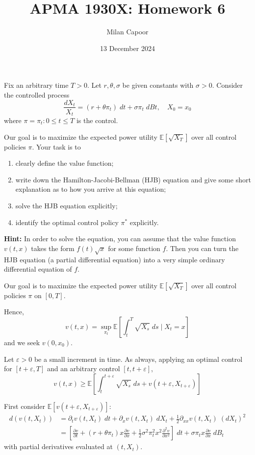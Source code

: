 \documentclass[12pt]{article}
\title{APMA 1930X: Homework 6}
\author{Milan Capoor}
\date{13 December 2024}
\newcommand{\E}{\mathbb{E}}
\newcommand{\ep}{\varepsilon}
\newcommand*{\tbf}[1]{\ifmmode\mathbf{#1}\else\textbf{#1}\fi}
\begin{document}
\maketitle

Fix an arbitrary time $T > 0$. Let $r, \theta, \sigma$ be given constants with $\sigma > 0$.
Consider the controlled process
\[\frac{dX_t}{X_t} = (r + \theta \pi_t)\; dt + \sigma \pi_t \; dBt,\quad X_0 = x_0\] 
where $\pi  = {\pi_t : 0 \leq t \leq T}$ is the control. 

Our goal is to maximize the expected power utility $\E[\sqrt{X_T}]$ over all control policies $\pi$. Your task is to
\begin{enumerate}
    \item clearly define the value function;
    \item write down the Hamilton-Jacobi-Bellman (HJB) equation and give some short explanation as to how you arrive at this equation;
    \item solve the HJB equation explicitly;
    \item identify the optimal control policy $\pi^*$ explicitly.
\end{enumerate}

\tbf{Hint:} In order to solve the equation, you can assume that the value function $v(t, x)$ takes the form $f(t)\sqrt{x}$ for some function $f$. Then you can turn the HJB equation (a partial differential equation) into a very simple ordinary differential equation of $f$.

    \color{blue}
        Our goal is to maximize the expected power utility $\E[\sqrt{X_T}]$ over all control policies $\pi$ on $[0, T]$.

        Hence, 
        \[v(t, x) = \sup_{\pi_t} \E\left[\int_t^{T} \sqrt{X_s}\; ds \; | \; X_t = x\right]\]
        and we seek $v(0, x_0)$. 

        Let $\ep > 0$ be a small increment in time. As always, applying an optimal control for $[t + \ep, T]$ and an arbitrary control $[t, t + \ep]$, 
        \[v(t, x) \geq \E\left[\int_t^{t + \ep} \sqrt{X_s}\; ds + v(t+ \ep, X_{t + \ep}) \right]\]

        First consider $\E[v(t + \ep, X_{t + \ep})]$:
        \begin{align*}
            d(v(t, X_t)) &= \partial_t v(t, X_t) \; dt + \partial_x v(t, X_t) \; dX_t + \frac{1}{2} \partial_{xx} v(t, X_t) \; (dX_t)^2\\
            &= \left[\frac{\partial v}{\partial t} + (r + \theta \pi_t)x \frac{\partial v}{\partial x} + \frac{1}{2} \sigma^2 \pi_t^2x^2 \frac{\partial^2 v}{\partial x^2}\right] \; dt + \sigma \pi_t x \frac{\partial v}{\partial x} \; dB_t
        \end{align*}
        with partial derivatives evaluated at $(t, X_t)$.
\end{document}
